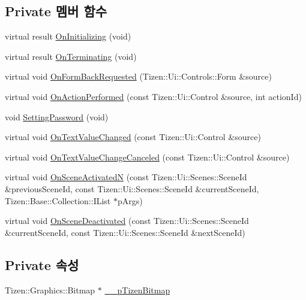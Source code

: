 \subsection*{Private 멤버 함수}
\begin{DoxyCompactItemize}
\item 
virtual result \hyperlink{class_setting_password_form_a776f00aff163b4c73595ab5f3c7c4ec4}{On\+Initializing} (void)
\item 
virtual result \hyperlink{class_setting_password_form_a900fef3ce31ac7533f3e9927484a5713}{On\+Terminating} (void)
\item 
virtual void \hyperlink{class_setting_password_form_a6a96e7320401fd596cef73874d320c35}{On\+Form\+Back\+Requested} (Tizen\+::\+Ui\+::\+Controls\+::\+Form \&source)
\item 
virtual void \hyperlink{class_setting_password_form_a937863d92ce8c520d3ef7f2f4c00b4dd}{On\+Action\+Performed} (const Tizen\+::\+Ui\+::\+Control \&source, int action\+Id)
\item 
void \hyperlink{class_setting_password_form_a268f79321098a4b1062d2e871e76471b}{Setting\+Password} (void)
\item 
virtual void \hyperlink{class_setting_password_form_ae2a53e61e56073a22b1f823cc7699d01}{On\+Text\+Value\+Changed} (const Tizen\+::\+Ui\+::\+Control \&source)
\item 
virtual void \hyperlink{class_setting_password_form_a69f476a00a34ddc18f182d3507928aa1}{On\+Text\+Value\+Change\+Canceled} (const Tizen\+::\+Ui\+::\+Control \&source)
\item 
virtual void \hyperlink{class_setting_password_form_adb2ed7c87f80690d79647640153954e5}{On\+Scene\+Activated\+N} (const Tizen\+::\+Ui\+::\+Scenes\+::\+Scene\+Id \&previous\+Scene\+Id, const Tizen\+::\+Ui\+::\+Scenes\+::\+Scene\+Id \&current\+Scene\+Id, Tizen\+::\+Base\+::\+Collection\+::\+I\+List $\ast$p\+Args)
\item 
virtual void \hyperlink{class_setting_password_form_ac7cf1f48e8b03da426617648db1e543c}{On\+Scene\+Deactivated} (const Tizen\+::\+Ui\+::\+Scenes\+::\+Scene\+Id \&current\+Scene\+Id, const Tizen\+::\+Ui\+::\+Scenes\+::\+Scene\+Id \&next\+Scene\+Id)
\end{DoxyCompactItemize}
\subsection*{Private 속성}
\begin{DoxyCompactItemize}
\item 
Tizen\+::\+Graphics\+::\+Bitmap $\ast$ \hyperlink{class_setting_password_form_a60cc925eb42ef6db4a87fb7ed831443e}{\+\_\+\+\_\+p\+Tizen\+Bitmap}
\end{DoxyCompactItemize}



